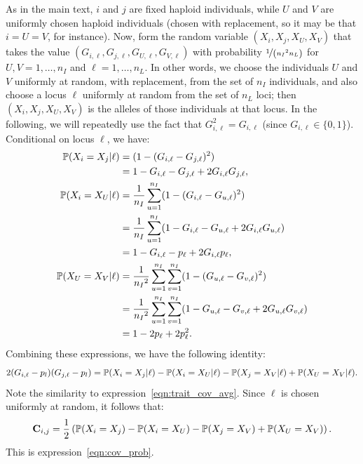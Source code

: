 As in the main text, $i$ and $j$ are fixed haploid individuals,
while $U$ and $V$ are uniformly chosen haploid individuals
(chosen with replacement, so it may be that $i=U=V$, for instance).
Now, form the random variable $(X_i, X_j, X_U, X_V)$
that takes the value $(G_{i,\ell}, G_{j,\ell}, G_{U,\ell}, G_{V,\ell})$
with probability $\nicefrac{1}{\left({n_I}^2 n_L\right)}$
for $U, V = 1, \dots, n_I$ and $\ell = 1, \dots, n_L$.
%
In other words, we choose the individuals $U$ and $V$ uniformly at
random, with replacement, from the set of $n_I$ individuals, and
also choose a locus $\ell$ uniformly at random from the set of $n_L$ loci;
then $(X_i, X_j, X_U, X_V)$ is the alleles of those individuals at that locus.
%
In the following, we will repeatedly use the fact that
$G^2_{i,\ell} = G_{i,\ell}$ (since $G_{i,\ell} \in \{0, 1\}$).
%
Conditional on locus $\ell$, we have:
%
\begin{align*}
    \P(X_i = X_j | \ell) &= (1 - (G_{i,\ell} - G_{j,\ell})^2) \\
                         &= 1 - G_{i,\ell} - G_{j,\ell} + 2G_{i,\ell}G_{j,\ell}, \\
    \P(X_i = X_U | \ell) &= \frac{1}{n_I}\sum_{u=1}^{n_I} (1 - (G_{i,\ell} - G_{u,\ell})^2) \\
                         &= \frac{1}{n_I}\sum_{u=1}^{n_I} (1 - G_{i,\ell} - G_{u,\ell} + 2G_{i,\ell}G_{u,\ell}) \\
                         &= 1 - G_{i,\ell} - p_\ell + 2G_{i,\ell}p_\ell, \\
    \P(X_U = X_V | \ell) &= \frac{1}{{n_I}^2}\sum_{u=1}^{n_I}\sum_{v=1}^{n_I} (1 - (G_{u,\ell} - G_{v,\ell})^2) \\
                         &= \frac{1}{{n_I}^2}\sum_{u=1}^{n_I}\sum_{v=1}^{n_I} (1 - G_{u,\ell} - G_{v,\ell} + 2G_{u,\ell}G_{v,\ell}) \\
                         &= 1 - 2p_\ell + 2p^2_\ell.
\end{align*}
%
Combining these expressions, we have the following identity:
%
\[ 2(G_{i,\ell} - p_l)(G_{j,\ell} - p_l) = \P(X_i = X_j | \ell) -
                                           \P(X_i = X_U | \ell) -
                                           \P(X_j = X_V | \ell) +
                                           \P(X_U = X_V | \ell) .\]
%
Note the similarity to expression~\eqref{eqn:trait_cov_avg}.
Since $\ell$ is chosen uniformly at random, it follows that:
%
\begin{align}
    \mathbf{C}_{i,j} = \frac{1}{2}\left(\P(X_i = X_j) - \P(X_i = X_U) - \P(X_j = X_V) + \P(X_U = X_V) \right).
\end{align}
This is expression~\eqref{eqn:cov_prob}.

